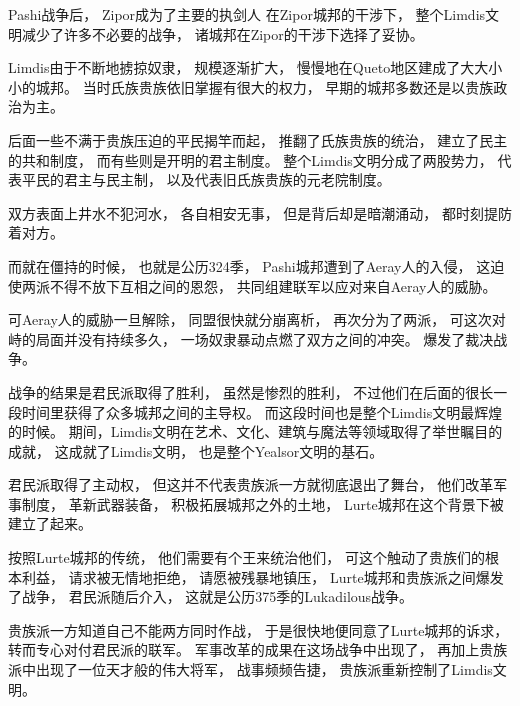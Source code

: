 \documentclass[UTF8,12pt,draft]{ctexbook}
\begin{document}
            Pashi战争后，
            Zipor成为了主要的执剑人
            在Zipor城邦的干涉下，
            整个Limdis文明减少了许多不必要的战争，
            诸城邦在Zipor的干涉下选择了妥协。



            Limdis由于不断地掳掠奴隶，
            规模逐渐扩大，
            慢慢地在Queto地区建成了大大小小的城邦。
            当时氏族贵族依旧掌握有很大的权力，
            早期的城邦多数还是以贵族政治为主。

            后面一些不满于贵族压迫的平民揭竿而起，
            推翻了氏族贵族的统治，
            建立了民主的共和制度，
            而有些则是开明的君主制度。
            整个Limdis文明分成了两股势力，
            代表平民的君主与民主制，
            以及代表旧氏族贵族的元老院制度。

            双方表面上井水不犯河水，
            各自相安无事，
            但是背后却是暗潮涌动，
            都时刻提防着对方。

            而就在僵持的时候，
            也就是公历324季，
            Pashi城邦遭到了Aeray人的入侵，
            这迫使两派不得不放下互相之间的恩怨，
            共同组建联军以应对来自Aeray人的威胁。

            可Aeray人的威胁一旦解除，
            同盟很快就分崩离析，
            再次分为了两派，
            可这次对峙的局面并没有持续多久，
            一场奴隶暴动点燃了双方之间的冲突。
            爆发了裁决战争。

            战争的结果是君民派取得了胜利，
            虽然是惨烈的胜利，
            不过他们在后面的很长一段时间里获得了众多城邦之间的主导权。
            而这段时间也是整个Limdis文明最辉煌的时候。
            期间，Limdis文明在艺术、文化、建筑与魔法等领域取得了举世瞩目的成就，
            这成就了Limdis文明，
            也是整个Yealsor文明的基石。

            君民派取得了主动权，
            但这并不代表贵族派一方就彻底退出了舞台，
            他们改革军事制度，
            革新武器装备，
            积极拓展城邦之外的土地，
            Lurte城邦在这个背景下被建立了起来。

            按照Lurte城邦的传统，
            他们需要有个王来统治他们，
            可这个触动了贵族们的根本利益，
            请求被无情地拒绝，
            请愿被残暴地镇压，
            Lurte城邦和贵族派之间爆发了战争，
            君民派随后介入，
            这就是公历375季的Lukadilous战争。

            贵族派一方知道自己不能两方同时作战，
            于是很快地便同意了Lurte城邦的诉求，
            转而专心对付君民派的联军。
            军事改革的成果在这场战争中出现了，
            再加上贵族派中出现了一位天才般的伟大将军，
            战事频频告捷，
            贵族派重新控制了Limdis文明。
\end{document}
